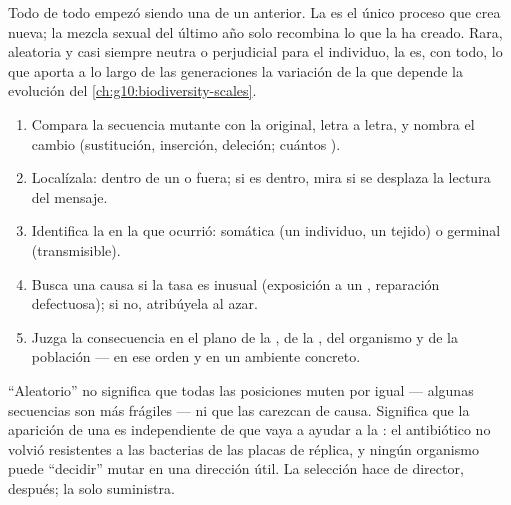 \begin{proposition}\label{prop:g11:mutations:source}
Todo  de todo  empezó siendo una  de un 
anterior. La  es el único proceso que crea 
nueva; la mezcla sexual del último año solo recombina lo que la
 ha creado. Rara, aleatoria y casi siempre neutra o perjudicial
para el individuo, la  es, con todo, lo que aporta a lo largo
de las generaciones la variación de la que depende la evolución del
\cref{ch:g10:biodiversity-scales}.
\end{proposition}
\admitted

\begin{method}\label{met:g11:mutations:analyse}
\begin{enumerate}
  \item Compara la secuencia mutante con la original, letra a letra, y
        nombra el cambio (sustitución, inserción, deleción; cuántos
        ).
  \item Localízala: dentro de un  o fuera; si es dentro, mira si se
        desplaza la lectura del mensaje.
  \item Identifica la  en la que ocurrió: somática (un individuo,
        un tejido) o germinal (transmisible).
  \item Busca una causa si la tasa es inusual (exposición a un
        , reparación defectuosa); si no, atribúyela al azar.
  \item Juzga la consecuencia en el plano de la , de la ,
        del organismo y de la población --- en ese orden y en un
        ambiente concreto.
\end{enumerate}
\end{method}

\begin{remark}\label{rem:g11:mutations:random}
``Aleatorio'' no significa que todas las posiciones muten por igual ---
algunas secuencias son más frágiles --- ni que las  carezcan
de causa. Significa que la aparición de una  es independiente
de que vaya a ayudar a la : el antibiótico no volvió resistentes
a las bacterias de las placas de réplica, y ningún organismo puede
``decidir'' mutar en una dirección útil. La selección hace de director,
después; la  solo suministra.
\end{remark}


